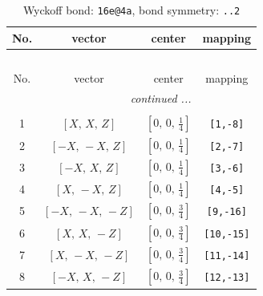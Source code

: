 \documentclass[fleqn,8pt]{jsarticle}
\begin{document}
\begin{longtable}{cccc}
\caption{Wyckoff bond: {\tt 16e@4a}, bond symmetry: {\tt ..2}}
 \\
 \hline \hline
No. & vector & center & mapping \\ \hline \endfirsthead

\multicolumn{3}{l}{\tablename\ \thetable{}} \\
 \hline \hline
No. & vector & center & mapping \\ \hline \endhead

 \hline \hline
\multicolumn{3}{r}{\footnotesize\it continued ...} \\ \endfoot

 \hline \hline
\multicolumn{3}{r}{} \\ \endlastfoot

1 & $\left[ X,\, X,\, Z \right]$ & $\left[ 0,\, 0,\, \frac{1}{4} \right]$ & {\tt [1,-8]} \\ \hline
2 & $\left[ - X,\, - X,\, Z \right]$ & $\left[ 0,\, 0,\, \frac{1}{4} \right]$ & {\tt [2,-7]} \\ \hline
3 & $\left[ - X,\, X,\, Z \right]$ & $\left[ 0,\, 0,\, \frac{1}{4} \right]$ & {\tt [3,-6]} \\ \hline
4 & $\left[ X,\, - X,\, Z \right]$ & $\left[ 0,\, 0,\, \frac{1}{4} \right]$ & {\tt [4,-5]} \\ \hline
5 & $\left[ - X,\, - X,\, - Z \right]$ & $\left[ 0,\, 0,\, \frac{3}{4} \right]$ & {\tt [9,-16]} \\ \hline
6 & $\left[ X,\, X,\, - Z \right]$ & $\left[ 0,\, 0,\, \frac{3}{4} \right]$ & {\tt [10,-15]} \\ \hline
7 & $\left[ X,\, - X,\, - Z \right]$ & $\left[ 0,\, 0,\, \frac{3}{4} \right]$ & {\tt [11,-14]} \\ \hline
8 & $\left[ - X,\, X,\, - Z \right]$ & $\left[ 0,\, 0,\, \frac{3}{4} \right]$ & {\tt [12,-13]} \\
\end{longtable}
\renewcommand{\arraystretch}{1.2}
\end{document}

